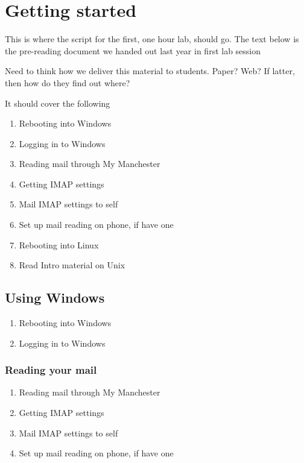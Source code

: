 
\chapter{Getting started}
\label{cha:getting-started}


\begin{note}
  This is where the script for the first, one hour lab, should go. The text below is the pre-reading document we handed out last year in first lab session

  Need to think how we deliver this material to students. Paper? Web?  If latter, then how do they find out where?

  It should cover the following
  \begin{enumerate}
  \item Rebooting into Windows
  \item Logging in to Windows
  \item Reading mail through My Manchester
  \item Getting IMAP settings
  \item Mail IMAP settings to self
  \item Set up mail reading on phone, if have one
  \item Rebooting into Linux
  \item Read Intro material on Unix
  \end{enumerate}
\end{note}


\section{Using Windows}
\label{sec:using-windows}
  \begin{enumerate}
  \item Rebooting into Windows
  \item Logging in to Windows
  \end{enumerate}


\subsection{Reading your mail}
\label{sec:reading-your-mail}
  \begin{enumerate}
  \item Reading mail through My Manchester
  \item Getting IMAP settings
  \item Mail IMAP settings to self
  \item Set up mail reading on phone, if have one
  \end{enumerate}


